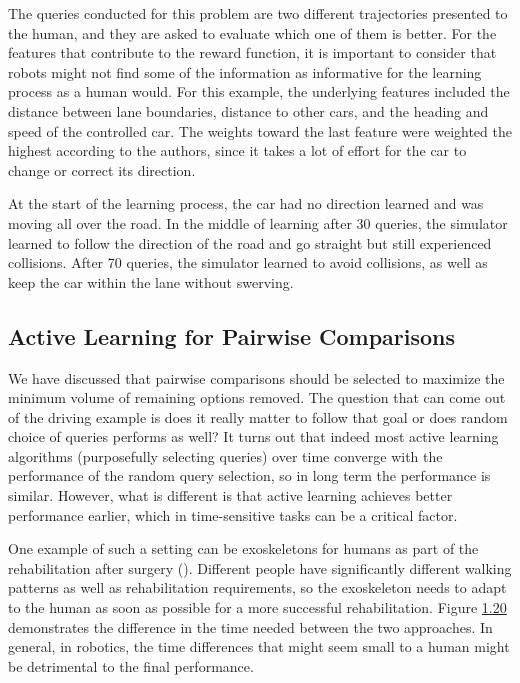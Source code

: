 \documentclass[
  letterpaper,
  DIV=11,
  numbers=noendperiod,
  oneside]{scrreprt}
\theoremstyle{remark}
\begin{document}
The queries conducted for this problem are two different trajectories
presented to the human, and they are asked to evaluate which one of them
is better. For the features that contribute to the reward function, it
is important to consider that robots might not find some of the
information as informative for the learning process as a human would.
For this example, the underlying features included the distance between
lane boundaries, distance to other cars, and the heading and speed of
the controlled car. The weights toward the last feature were weighted
the highest according to the authors, since it takes a lot of effort for
the car to change or correct its direction.

At the start of the learning process, the car had no direction learned
and was moving all over the road. In the middle of learning after 30
queries, the simulator learned to follow the direction of the road and
go straight but still experienced collisions. After 70 queries, the
simulator learned to avoid collisions, as well as keep the car within
the lane without swerving.

\subsection{Active Learning for Pairwise
Comparisons}\label{active-learning-for-pairwise-comparisons}

We have discussed that pairwise comparisons should be selected to
maximize the minimum volume of remaining options removed. The question
that can come out of the driving example is does it really matter to
follow that goal or does random choice of queries performs as well? It
turns out that indeed most active learning algorithms (purposefully
selecting queries) over time converge with the performance of the random
query selection, so in long term the performance is similar. However,
what is different is that active learning achieves better performance
earlier, which in time-sensitive tasks can be a critical factor.

One example of such a setting can be exoskeletons for humans as part of
the rehabilitation after surgery (). Different people have significantly different walking patterns
as well as rehabilitation requirements, so the exoskeleton needs to
adapt to the human as soon as possible for a more successful
rehabilitation. Figure \hyperref[fig:robotics]{1.20} demonstrates the
difference in the time needed between the two approaches. In general, in
robotics, the time differences that might seem small to a human might be
detrimental to the final performance.
\end{document}
